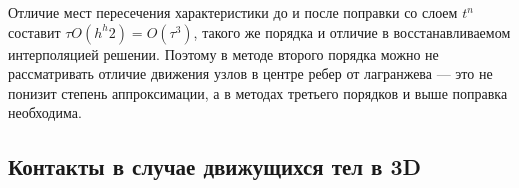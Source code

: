 Отличие мест пересечения характеристики до и после поправки со слоем
$t^n$ составит $\tau O(h^h2) = O(\tau^3)$, такого же порядка и отличие в 
восстанавливаемом интерполяцией решении. Поэтому в методе второго порядка можно
не рассматривать отличие движения узлов в центре ребер от лагранжева
— это не понизит степень аппроксимации, а в методах третьего порядков
и выше поправка необходима.

\subsection{Контакты в случае движущихся тел в 3D}

